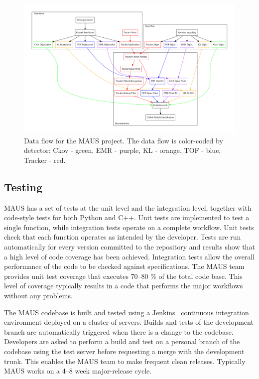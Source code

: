 \documentclass[11pt]{article}
\begin{document}
\begin{figure}[htbp]
  \centering
  \includegraphics[width=0.9\textheight, angle=90, origin=c]{figs/maus_process_diagram.pdf}
  \caption{Data flow for the MAUS project. The data flow is color-coded by detector: Ckov - green, EMR - purple, KL - orange, TOF - blue, Tracker - red. }
  \label{fig:maus_process_diagram}
\end{figure}

\subsection{Testing}\label{sec:maus-tests}
MAUS has a set of tests at the unit level and the integration level, together with code-style tests for both Python and C++. Unit tests are implemented to test a single function, while integration tests operate on a complete workflow. Unit tests check that each function operates as intended by the developer. Tests are run automatically for every version committed to the repository and results show that a high level of code coverage has been achieved. Integration tests allow the overall performance of the code to be checked against specifications. The MAUS team provides unit test coverage that executes 70--80 $\%$ of the total code base. This level of coverage typically results in a code that performs the major workflows without any problems.
%

The MAUS codebase is built and tested using a Jenkins~\cite{Jenkins} continuous integration environment deployed on a cluster of servers. Builds and tests of the development branch are automatically triggered when there is a change to the codebase.  Developers are asked to perform a build and test on a personal branch of the codebase using the test server before requesting a merge with the development trunk. This enables the MAUS team to make frequent clean releases. Typically MAUS works on a 4--8 week major-release cycle.
\end{document}
